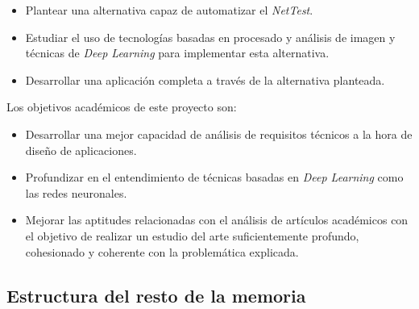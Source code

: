 \begin{itemize}
    \item Plantear una alternativa capaz de automatizar el \textit{NetTest}.
    \item Estudiar el uso de tecnologías basadas en procesado y análisis de imagen y técnicas de \textit{Deep Learning} para implementar esta alternativa.
    \item Desarrollar una aplicación completa a través de la alternativa planteada.
\end{itemize}

Los objetivos académicos de este proyecto son:

\begin{itemize}
    \item Desarrollar una mejor capacidad de análisis de requisitos técnicos a la hora de diseño de aplicaciones.
    \item Profundizar en el entendimiento de técnicas basadas en \textit{Deep Learning} como las redes neuronales.
    \item Mejorar las aptitudes relacionadas con el análisis de artículos académicos con el objetivo de realizar un estudio del arte suficientemente profundo, cohesionado y coherente con la problemática explicada.
\end{itemize}


\subsection{Estructura del resto de la memoria}

